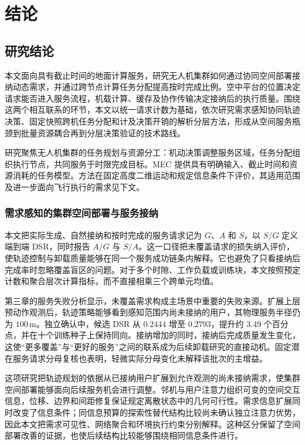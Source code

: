 \chapter{结论}
\label{cha:conclusion}

\section{研究结论}
\label{sec:ch6-summary}

本文面向具有截止时间的地面计算服务，研究无人机集群如何通过协同空间部署接纳动态需求，并通过跨节点计算任务分配提高按时完成比例。空中平台的位置决定请求能否进入服务流程，机载计算、缓存及协作传输决定接纳后的执行质量。围绕这两个相互联系的环节，本文以统一请求计数为基础，依次研究需求感知协同轨迹决策、固定快照跨机任务分配和计及决策开销的解析分层方法，形成从空间服务瓶颈到批量资源耦合再到分层决策验证的技术路线。

研究聚焦无人机集群的任务规划与资源分工：机动决策调整服务区域，任务分配组织执行节点，共同服务于时限完成目标。MEC 提供具有明确输入、截止时间和资源消耗的任务模型。方法在固定高度二维运动和规定信息条件下评价，其适用范围及进一步面向飞行执行的需求见下文。

\subsection{需求感知的集群空间部署与服务接纳}
\label{sec:ch6-observation-summary}

本文把实际生成、自然接纳和按时完成的服务请求记为 $G$、$A$ 和 $S$，以 $S/G$ 定义端到端 DSR，同时报告 $A/G$ 与 $S/A$。这一口径把未覆盖请求的损失纳入评价，使轨迹控制与卸载质量能够在同一个服务成功链条内解释。它也避免了只看接纳后完成率时忽略覆盖盲区的问题。对于多个时隙、工作负载或训练块，本文按照预定计数和聚合层次计算指标，而不直接相乘三个跨单元均值。

第三章的服务失败分析显示，未覆盖需求构成主场景中重要的失败来源。扩展上层预动作观测后，轨迹策略能够看到感知范围内尚未接纳的用户，其物理服务半径仍为 $100\,\mathrm{m}$。独立确认中，候选 DSR 从 $0.2444$ 增至 $0.2793$，提升约 $3.49$ 个百分点，并在十个训练种子上保持同向。接纳增加的同时，接纳后完成质量发生变化，这使“更多覆盖”与“更好的服务”之间的联系成为后续卸载研究的直接动机。固定潜在服务请求分母复核也表明，轻微实际分母变化未解释该批次的主增益。

这项研究把轨迹规划的依据从已接纳用户扩展到允许观测的尚未接纳需求，使集群空间部署能够面向后续服务机会进行调整。邻机与用户注意力组织可变的空间交互信息，位移、边界和间距修复保证规定离散状态中的几何可行性。需求信息扩展同时改变了信息条件；同信息预算的探索性替代结构比较尚未确认独立注意力优势，因此本文把需求可见性、网络聚合和环境执行约束分别解释。这种区分保留了空间部署改善的证据，也使后续结构比较能够围绕相同信息条件进行。

